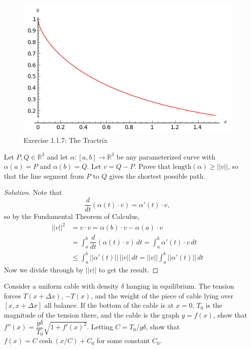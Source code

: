 \documentclass[Shifrin_Solutions_Spring_2015]{subfiles}
\begin{document}
\begin{figure}[h]
\centering
\includegraphics[width=.5\textwidth]{picturebook/ch1sec1/ex1-1-7}
\caption{Exercise 1.1.7: The Tractrix}
\end{figure}





\begin{exercise}
Let $P, Q \in \mathbb{R}^3$ and let $\alpha: [a,b] \rightarrow \mathbb{R}^3$ be any parameterized curve with $\alpha(a) = P$ and $\alpha(b) = Q$. Let $v= Q-P$. Prove that $\text{length}(\alpha) \geq ||v||$, so that the line segment from $P$ to $Q$ gives the shortest possible path.
\end{exercise}

\begin{proof}[Solution]
Note that
\[
\dfrac{d}{dt}\left( \alpha(t)\cdot v \right) = \alpha'(t)\cdot v ,
\]
so by the Fundamental Theorem of Calculus,
\[
\begin{split}
||v||^2 & = v \cdot v  =  \alpha(b)\cdot v - \alpha(a) \cdot v  \\
	& =  \int_a^b \dfrac{d}{dt}\left( \alpha(t)\cdot v \right) \, dt    = \int_a^b \alpha'(t)\cdot v \, dt \\
	& \leq \int_a^b ||\alpha'(t)|| \, ||v||\, dt = ||v|| \int_a^b ||\alpha'(t)||\, dt
\end{split}
\]
Now we divide through by $||v||$ to get the result.
\end{proof}

\vspace{.5cm}



\begin{exercise}
Consider a uniform cable with density $\delta$ hanging in equilibrium. The tension forces $T(x + \Delta x)$, $-T(x)$, and the weight of the piece of cable lying over $[x,x+\Delta x]$ all balance. If the bottom of the cable is at $x=0$, $T_0$ is the magnitude of the tension there, and the cable is the graph $y=f(x)$, show that $f''(x) = \dfrac{g\delta}{T_0}\sqrt{1 + f'(x)^2}$.  Letting $C = T_0/g\delta$, show that $f(x) = C\cosh(x/C) + C_0$ for some constant $C_0$.
\end{exercise}
\end{document}
